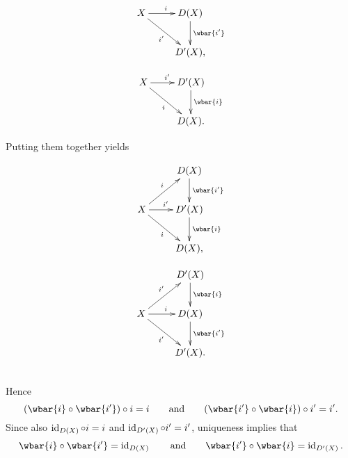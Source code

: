 \begin{enumerate}[label = \textbf{Exercise \arabic*.},wide = 0pt, itemsep=1.5ex]
\begin{enumerate}[label = \textup{(}\alph*\textup{)}]
				\begin{figure}[h!tb]
					\begin{subfigure}{0.3\textwidth}
						\begin{displaymath}
    						\xymatrix{X \ar[r]^i\ar[dr]_{i'} & D(X) \ar[d]^{\wbar{i'}}\\
						 	& D'(X),}
						\end{displaymath}
					\end{subfigure}
					\quad
					\begin{subfigure}{0.3\textwidth}
						\begin{displaymath}
							\xymatrix{X \ar[r]^{i'}\ar[dr]_{i} & D'(X) \ar[d]^{\wbar{i}}\\
						 	& D(X).}
						\end{displaymath}
					\end{subfigure}
				\end{figure}
				Putting them together yields
				\begin{figure}[h!tb]
					\begin{subfigure}{0.3\textwidth}
						\begin{displaymath}
							\xymatrix{& D(X) \ar[d]^{\wbar{i'}}\\
							X \ar[ur]^i \ar[r]^{i'}\ar[dr]_{i} & D'(X) \ar[d]^{\wbar{i}}\\
						 		& D(X),}
						\end{displaymath}
					\end{subfigure}
					\quad
					\begin{subfigure}{0.3\textwidth}
						\begin{displaymath}
							\xymatrix{& D'(X) \ar[d]^{\wbar{i}}\\
							X \ar[ur]^{i'} \ar[r]^{i}\ar[dr]_{i'} & D(X) \ar[d]^{\wbar{i'}}\\
						 		& D'(X).}
						\end{displaymath}
					\end{subfigure}
				\end{figure}\\
				Hence
				\begin{equation*}
					(\wbar{i} \circ \wbar{i'}) \circ i = i \qquad \text{and} \qquad (\wbar{i'} \circ \wbar{i}) \circ i' = i'.
				\end{equation*}
				Since also $\operatorname{id}_{D(X)} \circ i = i$ and $\operatorname{id}_{D'(X)} \circ i' = i'$, uniqueness implies that 
				\begin{equation*}
					\wbar{i} \circ \wbar{i'} = \id_{D(X)} \qquad \text{and} \qquad \wbar{i'} \circ \wbar{i} = \id_{D'(X)}.

\end{equation*}
\end{enumerate}
\end{enumerate}

